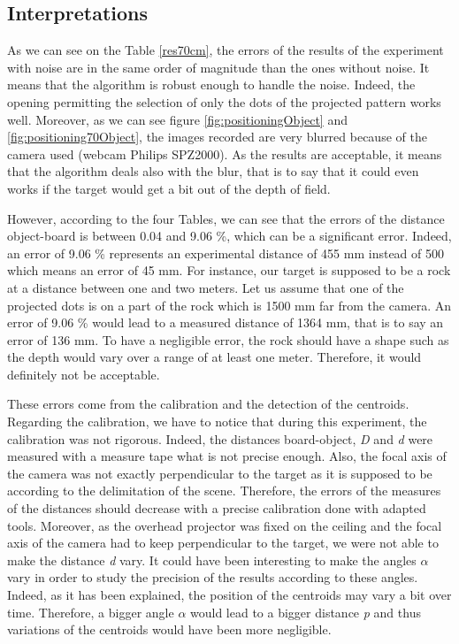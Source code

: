 \subsection{Interpretations}
As we can see on the Table \ref{res70cm}, the errors of the results of the experiment with noise are in the same order of magnitude than the ones without noise. It means that the algorithm is robust enough to handle the noise. Indeed, the 
opening permitting the selection of only the dots of the projected pattern works well. Moreover, as we can see figure \ref{fig:positioningObject} and \ref{fig:positioning70Object}, the images recorded are very blurred because of the camera used (webcam Philips SPZ2000). As the results are acceptable, it means that the algorithm deals also with the blur, that is to say that it could even works if the target would get a bit out of the depth of field.

However, according to the four Tables, we can see that the errors of the distance object-board is between 0.04 and 9.06 \%, which can be a significant error. Indeed, an error of 9.06 \% represents an experimental distance of 455 mm instead of 500 which means an error of 45 mm. For instance, our target is supposed to be a rock at a distance between one and two meters. Let us assume that one of the projected dots is on a part of the rock which is 1500 mm far from the camera. An error of 9.06 \% would lead to a measured distance of 1364 mm, that is to say an error of 136 mm. To have a negligible error, the rock should have a shape such as the depth would vary over a range of at least one meter. Therefore, it would definitely not be acceptable.

These errors come from the calibration and the detection of the centroids. Regarding the calibration, we have to notice that during this experiment, the calibration was not rigorous. Indeed, the distances board-object, \emph{D} and \emph{d} were measured with a measure tape what is not precise enough. Also, the focal axis of the camera was not exactly perpendicular to the target as it is supposed to be according to the delimitation of the scene. Therefore, the errors of the measures of the distances should decrease with a precise calibration done with adapted tools. Moreover, as the overhead projector was fixed on the ceiling and the focal axis of the camera had to keep perpendicular to the target, we were not able to make the distance \emph{d} vary. It could have been interesting to make the angles $\alpha$ vary in order to study the precision of the results according to these angles. Indeed, as it has been explained, the position of the centroids may vary a bit over time. Therefore, a bigger angle $\alpha$ would lead to a bigger distance \emph{p} and thus variations of the centroids would have been more negligible.


